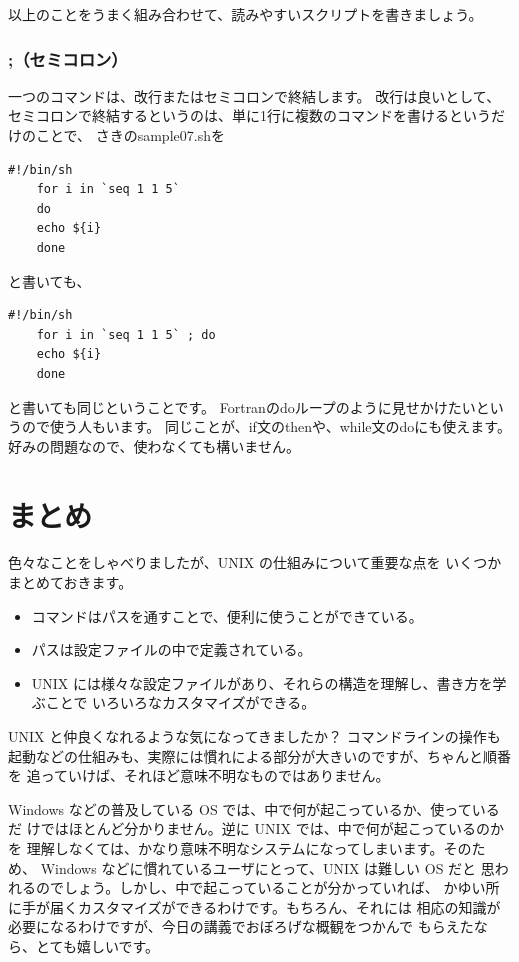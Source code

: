 \documentclass[a4j]{ltjreport}
\begin{document}
    以上のことをうまく組み合わせて、読みやすいスクリプトを書きましょう。

    \subsection{;（セミコロン）}
    一つのコマンドは、改行またはセミコロンで終結します。
    改行は良いとして、セミコロンで終結するというのは、単に1行に複数のコマンドを書けるというだけのことで、
    さきのsample07.shを
    \begin{lstlisting}[caption=sample07.sh 改6]
    #!/bin/sh
    for i in `seq 1 1 5`
    do
    echo ${i}
    done
    \end{lstlisting}
    と書いても、
    \begin{lstlisting}[caption=sample07.sh 改7]
    #!/bin/sh
    for i in `seq 1 1 5` ; do
    echo ${i}
    done
    \end{lstlisting}
    と書いても同じということです。
    Fortranのdoループのように見せかけたいというので使う人もいます。
    同じことが、if文のthenや、while文のdoにも使えます。
    好みの問題なので、使わなくても構いません。


    \chapter{まとめ}
    色々なことをしゃべりましたが、UNIX の仕組みについて重要な点を
    いくつかまとめておきます。
    \begin{itemize}
        \item コマンドはパスを通すことで、便利に使うことができている。
        \item パスは設定ファイルの中で定義されている。
        \item UNIX には様々な設定ファイルがあり、それらの構造を理解し、書き方を学ぶことで
            いろいろなカスタマイズができる。
    \end{itemize}

    UNIX と仲良くなれるような気になってきましたか？ コマンドラインの操作も
    起動などの仕組みも、実際には慣れによる部分が大きいのですが、ちゃんと順番を
    追っていけば、それほど意味不明なものではありません。

    Windows などの普及している OS では、中で何が起こっているか、使っているだ
    けではほとんど分かりません。逆に UNIX では、中で何が起こっているのかを
    理解しなくては、かなり意味不明なシステムになってしまいます。そのため、
    Windows などに慣れているユーザにとって、UNIX は難しい OS だと
    思われるのでしょう。しかし、中で起こっていることが分かっていれば、
    かゆい所に手が届くカスタマイズができるわけです。もちろん、それには
    相応の知識が必要になるわけですが、今日の講義でおぼろげな概観をつかんで
    もらえたなら、とても嬉しいです。
\end{document}
